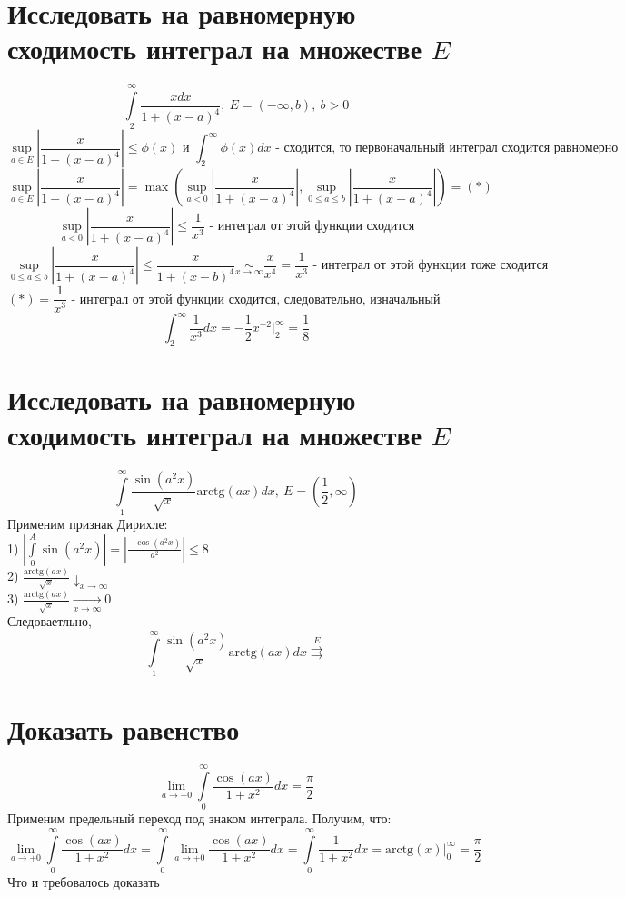 \documentclass{article}
\begin{document}
	
	\section{Исследовать на равномерную сходимость интеграл на множестве $E$}
	\[\int\limits_2^\infty\frac{xdx}{1+(x-a)^4}, \ E = (-\infty, b), \ b > 0\]
	\[\underset{a\in E}{\sup}\left|\frac{x}{1+(x-a)^4}\right| \le \phi(x) \text{ и }\int_2^{\infty}\phi(x)dx \text{ - сходится, то первоначальный интеграл сходится равномерно}\]
	\[\underset{a\in E}{\sup}\left|\frac{x}{1+(x-a)^4}\right|= \max\left(\underset{a<0}{\sup}\left|\frac{x}{1+(x-a)^4}\right|, \underset{0\le a\le b}{\sup}\left|\frac{x}{1+(x-a)^4}\right|\right) = (*)\] 
	\[\underset{a<0}{\sup}\left|\frac{x}{1+(x-a)^4}\right| \le \frac{1}{x^3} \text{ - интеграл от этой функции сходится}\]
	\[\underset{0\le a \le b}{\sup}\left|\frac{x}{1+(x-a)^4}\right| \le \frac{x}{1+(x-b)^4} \underset{x\rightarrow\infty}{\sim} \frac{x}{x^4} = \frac{1}{x^3} \text{ - интеграл от этой функции тоже сходится}\]
	\[(*) = \frac{1}{x^3}\text{ - интеграл от этой функции сходится, следовательно, изначальный интеграл.сходится равномерно }\]
	\[\int_2^\infty \frac{1}{x^3}dx = -\frac{1}{2}x^{-2}\bigg|_2^{\infty} = \frac{1}{8}\]
	\section{Исследовать на равномерную сходимость интеграл на множестве $E$}
	\[\int\limits_1^\infty \frac{\sin(a^2x)}{\sqrt{x}}\text{arctg}(ax)dx, \ E = \left(\frac{1}{2}, \infty\right)\]
	Применим признак Дирихле:\\
	1) $\left|\int\limits_0^A\sin(a^2x)\right| = \left|\frac{-\cos(a^2x)}{a^2}\right| \le 8$\\
	2) $\frac{\text{arctg}(ax)}{\sqrt{x}}\downarrow_{x\rightarrow\infty}$\\
	3) $\frac{\text{arctg}(ax)}{\sqrt{x}}\underset{x\rightarrow\infty}{\rightarrow}0$\\
	Следоваетльно,
	\[\int\limits_1^\infty \frac{\sin(a^2x)}{\sqrt{x}}\text{arctg}(ax)dx\overset{E}{\rightrightarrows}\]
	
	\section{Доказать равенство}
	\[\underset{a\rightarrow+0}{\lim}\int\limits_0^\infty\frac{\cos(ax)}{1+x^2}dx=\frac{\pi}{2}\]
	Применим предельный переход под знаком интеграла. Получим, что:
	\[\underset{a\rightarrow+0}{\lim}\int\limits_0^\infty\frac{\cos(ax)}{1+x^2}dx= \int\limits_0^\infty\underset{a\rightarrow+0}{\lim}\frac{\cos(ax)}{1+x^2}dx = 
	\int\limits_0^\infty\frac{1}{1+x^2}dx = \text{arctg}(x)\bigg|_0^\infty = \frac{\pi}{2}\]
	Что и требовалось доказать
	
	
	
	
\end{document}
